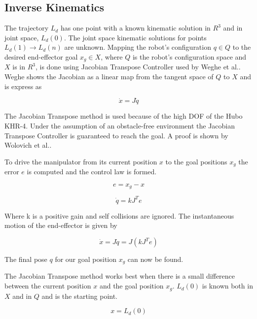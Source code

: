 \subsection{Inverse Kinematics}\label{sec:ik}
The trajectory $L_d$ has one point with a known kinematic solution in $R^3$ and in joint space, $L_d(0)$.  The joint space kinematic solutions for points $L_d(1) \rightarrow L_d(n)$ are unknown.  Mapping the robot's configuration $q \in Q$ to the desired end-effector goal $x_g \in X$, where $Q$ is the robot's configuration space and $X$ is in $R^3$, is done using Jacobian Transpose Controller used by Weghe et al.\cite{4813913}.  Weghe shows the Jacobian as a linear map from the tangent space of $Q$ to $X$ and is express as

\begin{equation}
\dot{x} = J\dot{q}
\end{equation}

  The Jacobian Transpose method is used because of the high DOF of the Hubo KHR-4.  Under the assumption of an obstacle-free environment the Jacobian Transpose Controller is guaranteed to reach the goal.  A proof is shown by Wolovich et al.\cite{4048118}.

To drive the manipulator from its current position $x$ to the goal positions $x_g$ the error $e$ is computed and the control law is formed.

\begin{equation}
e = x_g - x
\end{equation}

\begin{equation}
\dot{q} = kJ^Te
\end{equation}

Where k is a positive gain and self collisions are ignored.  The instantaneous motion of the end-effector is given by

\begin{equation}
\dot{x} = J\dot{q} = J(kJ^Te)
\end{equation}

The final pose $q$ for our goal position $x_g$ can now be found.

The Jacobian Transpose method works best when there is a small difference between the current position $x$ and the goal position $x_g$.  $L_d(0)$ is known both in $X$ and in $Q$ and is the starting point.

\begin{equation}
x = L_d(0)
\end{equation}

